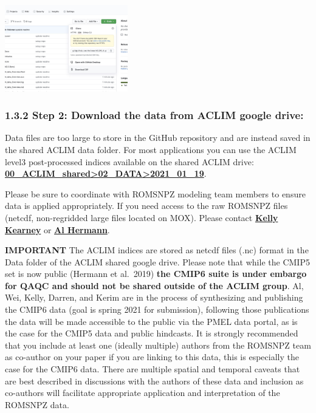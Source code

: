 \documentclass[
]{article}
\begin{document}
\includegraphics[width=0.4\textwidth,height=\textheight]{Figs/clone.jpg}

\hypertarget{step-2-download-the-data-from-aclim-google-drive}{%
\subsubsection{1.3.2 Step 2: Download the data from ACLIM google
drive:}\label{step-2-download-the-data-from-aclim-google-drive}}

Data files are too large to store in the GitHub repository and are
instead saved in the shared ACLIM data folder. For most applications you
can use the ACLIM level3 post-processed indices available on the shared
ACLIM drive:
\href{https://drive.google.com/drive/u/0/folders/0Bx7wdZllbuF9eDJndkhCS2EwQUk}{\textbf{00\_ACLIM\_shared\textgreater02\_DATA\textgreater2021\_01\_19}}.

Please be sure to coordinate with ROMSNPZ modeling team members to
ensure data is applied appropriately. If you need access to the raw
ROMSNPZ files (netcdf, non-regridded large files located on MOX). Please
contact \href{kelly.kearney@noaa.gov}{\textbf{Kelly Kearney}} or
\href{albert.j.hermann@noaa.gov}{\textbf{Al Hermann}}.

\textbf{IMPORTANT} The ACLIM indices are stored as netcdf files (.nc)
format in the Data folder of the ACLIM shared google drive. Please note
that while the CMIP5 set is now public (Hermann et al.~2019) \textbf{the
CMIP6 suite is under embargo for QAQC and should not be shared outside
of the ACLIM group}. Al, Wei, Kelly, Darren, and Kerim are in the
process of synthesizing and publishing the CMIP6 data (goal is spring
2021 for submission), following those publications the data will be made
accessible to the public via the PMEL data portal, as is the case for
the CMIP5 data and public hindcasts. It is strongly recommended that you
include at least one (ideally multiple) authors from the ROMSNPZ team as
co-author on your paper if you are linking to this data, this is
especially the case for the CMIP6 data. There are multiple spatial and
temporal caveats that are best described in discussions with the authors
of these data and inclusion as co-authors will facilitate appropriate
application and interpretation of the ROMSNPZ data.
\end{document}
